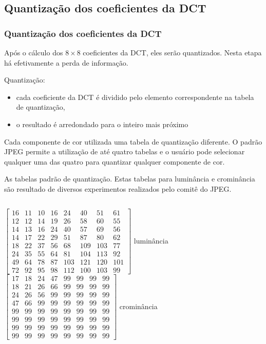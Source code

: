 \subsection{Quantização dos coeficientes da DCT}
\begin{frame}[allowframebreaks]
  \frametitle{Quantização dos coeficientes da DCT}
  Após o cálculo dos $8 \times 8$ coeficientes da DCT, eles serão quantizados.
  Nesta etapa há efetivamente a perda de informação.

  \vspace{1em}
  Quantização:
  \begin{itemize}
  \item cada coeficiente da DCT é dividido pelo elemento correspondente na tabela de quantização,
  \item o resultado é arredondado para o inteiro mais próximo
  \end{itemize}

  \vspace{2em}
  Cada componente de cor utilizada uma tabela de quantização diferente.
  O padrão JPEG permite a utilização de até quatro tabelas e o usuário pode selecionar
  qualquer uma das quatro para quantizar qualquer componente de cor.

  \framebreak

  As tabelas padrão de quantização. Estas tabelas para luminância e crominância
  são resultado de diversos experimentos realizados pelo comitê do JPEG.

  \vspace{3ex}
  \begin{columns}[c]
  $
  \begin{bmatrix}
  16 & 11 & 10 & 16 & 24 & 40 & 51 & 61 \\   
  12 & 12 & 14 & 19 & 26 & 58 & 60 & 55 \\  
  14 & 13 & 16 & 24 & 40 & 57 & 69 & 56 \\
  14 & 17 & 22 & 29 & 51 & 87 & 80 & 62 \\
  18 & 22 & 37 & 56 & 68 & 109 & 103 & 77 \\
  24 & 35 & 55 & 64 & 81 & 104 & 113 & 92 \\
  49 & 64 & 78 & 87 & 103 & 121 & 120 & 101 \\
  72 & 92 & 95 & 98 & 112 & 100 & 103 & 99 
  \end{bmatrix}
  $
  luminância
  $
  \begin{bmatrix}
  17 & 18 & 24 & 47 & 99 & 99 & 99 & 99 \\
  18 & 21 & 26 & 66 & 99 & 99 & 99 & 99 \\
  24 & 26 & 56 & 99 & 99 & 99 & 99 & 99 \\
  47 & 66 & 99 & 99 & 99 & 99 & 99 & 99 \\
  99 & 99 & 99 & 99 & 99 & 99 & 99 & 99 \\
  99 & 99 & 99 & 99 & 99 & 99 & 99 & 99 \\
  99 & 99 & 99 & 99 & 99 & 99 & 99 & 99 \\
  99 & 99 & 99 & 99 & 99 & 99 & 99 & 99 
  \end{bmatrix}
  $
  crominância
  \end{columns}


\end{frame}
